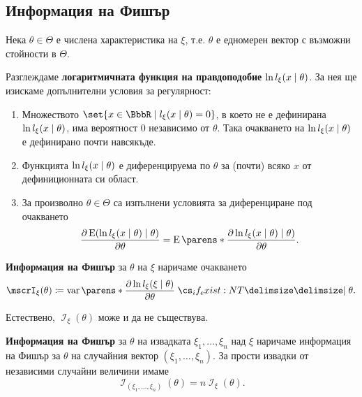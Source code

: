 \documentclass{../../common/topic}
\begin{document}
\subsection{Информация на Фишър}

\begin{definition}\label{def:fisher_information}
  Нека \( \theta \in \Theta \) е числена характеристика на \( \xi \), т.е. \( \theta \) е едномерен вектор с възможни стойности в \( \Theta \).

  Разглеждаме \textbf{логаритмичната функция на правдоподобие} \( \ln l_\xi(x \given \theta) \). За нея ще изискаме допълнителни условия за регулярност:
  \begin{enumerate}
    \item Множеството \( \set{ x \in \BbbR \given l_\xi(x \given \theta) = 0 } \), в което не е дефинирана \( \ln l_\xi(x \given \theta) \), има вероятност \( 0 \) независимо от \( \theta \). Така очакването на \( \ln l_\xi(x \given \theta) \) е дефинирано почти навсякъде.
    \item Функцията \( \ln l_\xi(x \given \theta) \) е диференцируема по \( \theta \) за (почти) всяко \( x \) от дефиниционната си област.
    \item За произволно \( \theta \in \Theta \) са изпълнени условията за диференциране под очакването
    \begin{equation*}
      \frac {\partial \Expect(\ln l_\xi(x \given \theta) \given \theta)} {\partial \theta}
      =
      \Expect\parens*{ \frac {\partial \ln l_\xi(x \given \theta) \given \theta)} {\partial \theta} }.
    \end{equation*}
  \end{enumerate}

  \textbf{Информация на Фишър} за \( \theta \) на \( \xi \) наричаме очакването
  \begin{equation*}
    \mscrI_\xi(\theta) \coloneqq \var\parens*{ \frac {\partial \ln l_\xi(\xi \given \theta)} {\partial \theta} \given* \theta }.
  \end{equation*}

  Естествено, \( \mscrI_\xi(\theta) \) може и да не съществува.

  \textbf{Информация на Фишър} за \( \theta \) на извадката \( \xi_1, \ldots, \xi_n \) над \( \xi \) наричаме информация на Фишър за \( \theta \) на случайния вектор \( (\xi_1, \ldots, \xi_n) \). За прости извадки от независими случайни величини имаме
  \begin{equation*}
    \mscrI_{(\xi_1, \ldots, \xi_n)}(\theta) = n \mscrI_\xi(\theta).
  \end{equation*}
\end{definition}
\end{document}
